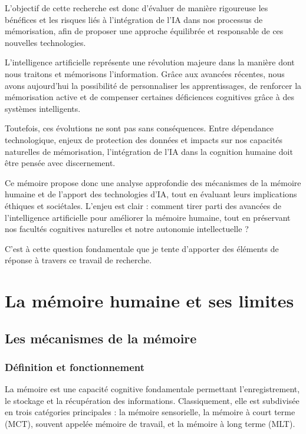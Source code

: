 \documentclass[11pt,a4paper]{report}
\begin{document}
L’objectif de cette recherche est donc d’évaluer de manière rigoureuse les bénéfices et les risques liés à l’intégration de l’IA dans nos processus de mémorisation, afin de proposer une approche équilibrée et responsable de ces nouvelles technologies.

L’intelligence artificielle représente une révolution majeure dans la manière dont nous traitons et mémorisons l’information. Grâce aux avancées récentes, nous avons aujourd’hui la possibilité de personnaliser les apprentissages, de renforcer la mémorisation active et de compenser certaines déficiences cognitives grâce à des systèmes intelligents.

Toutefois, ces évolutions ne sont pas sans conséquences. Entre dépendance technologique, enjeux de protection des données et impacts sur nos capacités naturelles de mémorisation, l’intégration de l’IA dans la cognition humaine doit être pensée avec discernement.

Ce mémoire propose donc une analyse approfondie des mécanismes de la mémoire humaine et de l’apport des technologies d’IA, tout en évaluant leurs implications éthiques et sociétales. L’enjeu est clair : comment tirer parti des avancées de l’intelligence artificielle pour améliorer la mémoire humaine, tout en préservant nos facultés cognitives naturelles et notre autonomie intellectuelle ?

C’est à cette question fondamentale que je tente d’apporter des éléments de réponse à travers ce travail de recherche.



\chapter{La mémoire humaine et ses limites}
\section{Les mécanismes de la mémoire}
\subsection{Définition et fonctionnement}
La mémoire est une capacité cognitive fondamentale permettant l'enregistrement, le stockage et la récupération des informations. Classiquement, elle est subdivisée en trois catégories principales : la mémoire sensorielle, la mémoire à court terme (MCT), souvent appelée mémoire de travail, et la mémoire à long terme (MLT).
\end{document}
